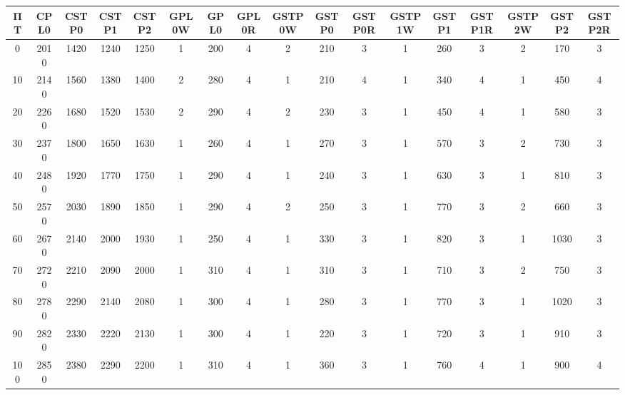 \begin{tabular}{|c|c|c|c|c|c|c|c|c|c|c|c|c|c|c|c|c|}
\hline
ΠΤ&CPL0&CSTP0&CSTP1&CSTP2&GPL0W&GPL0&GPL0R&GSTP0W&GSTP0&GSTP0R&GSTP1W&GSTP1&GSTP1R&GSTP2W&GSTP2&GSTP2R\\\hline
\hline
0&2010&1420&1240&1250&1&200&4&2&210&3&1&260&3&2&170&3\\
\hline
10&2140&1560&1380&1400&2&280&4&1&210&4&1&340&4&1&450&4\\
\hline
20&2260&1680&1520&1530&2&290&4&2&230&3&1&450&4&1&580&3\\
\hline
30&2370&1800&1650&1630&1&260&4&1&270&3&1&570&3&2&730&3\\
\hline
40&2480&1920&1770&1750&1&290&4&1&240&3&1&630&3&1&810&3\\
\hline
50&2570&2030&1890&1850&1&290&4&2&250&3&1&770&3&2&660&3\\
\hline
60&2670&2140&2000&1930&1&250&4&1&330&3&1&820&3&1&1030&3\\
\hline
70&2720&2210&2090&2000&1&310&4&1&310&3&1&710&3&2&750&3\\
\hline
80&2780&2290&2140&2080&1&300&4&1&280&3&1&770&3&1&1020&3\\
\hline
90&2820&2330&2220&2130&1&300&4&1&220&3&1&720&3&1&910&3\\
\hline
100&2850&2380&2290&2200&1&310&4&1&360&3&1&760&4&1&900&4\\
\hline
\end{tabular}

